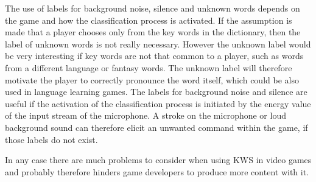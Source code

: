 The use of labels for background noise, silence and unknown words depends on the game and how the classification process is activated.
If the assumption is made that a player chooses only from the key words in the dictionary, then the label of unknown words is not really necessary.
However the unknown label would be very interesting if key words are not that common to a player, such as words from a different language or fantasy words.
The unknown label will therefore motivate the player to correctly pronounce the word itself, which could be also used in language learning games.
The labels for background noise and silence are useful if the activation of the classification process is initiated by the energy value of the input stream of the microphone.
A stroke on the microphone or loud background sound can therefore elicit an unwanted command within the game, if those labels do not exist.

In any case there are much problems to consider when using KWS in video games and probably therefore hinders game developers to produce more content with it.

